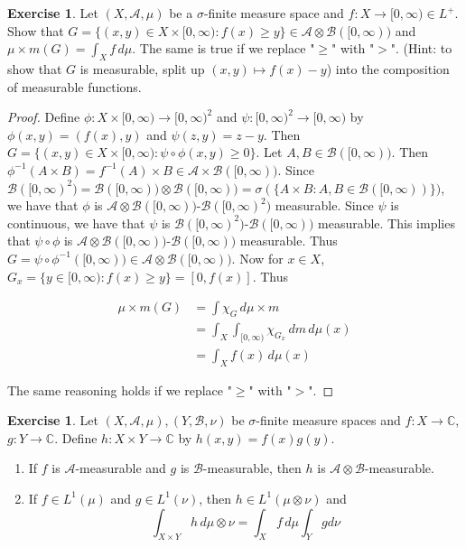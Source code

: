 \documentclass{book}
\theoremstyle{definition}
\newtheorem{ex}[definition]{Exercise}
\newcommand{\sig}{\sigma}
\newcommand{\C}{\mathbb{C}}
\newcommand{\MA}{\mathcal{A}}
\newcommand{\MB}{\mathcal{B}}
\newcommand{\lex}[1]{\label{ex:#1}}
\DeclareMathOperator*{\0}{\mbf{0}}
\DeclareMathOperator*{\1}{\mbf{1}}
\newcommand{\Rg}{[0,\infty)}
\newcommand{\dmu}{\, d \mu}
\newcommand{\dm}{\, d m}
\begin{document}
	\begin{ex} \lex{00000} 
		Let $(X, \MA, \mu)$ be a $\sig$-finite measure space and $f:X \rightarrow \Rg \in L^+$. Show that $G = \{(x,y) \in X \times \Rg: f(x) \geq y\} \in \MA \otimes \MB(\Rg)$ and $\mu \times m (G) = \int_X f \dmu$. The same is true if we replace "$\geq$" with "$>$". (Hint: to show that $G$ is measurable, split up $(x,y) \mapsto f(x) - y$) into the composition of measurable functions. 
	\end{ex}
	
	\begin{proof}
		Define $\phi: X \times \Rg \rightarrow \Rg^2$ and $\psi: \Rg^2 \rightarrow \Rg$ by $\phi(x,y) = (f(x),y)$ and $\psi(z,y) = z-y$. Then $G = \{(x,y) \in X \times \Rg: \psi \circ \phi(x,y) \geq 0\}$. Let $A, B \in \MB(\Rg)$. Then $\phi^{-1}(A \times B) = f^{-1}(A) \times B \in \MA \times \MB(\Rg)$. Since $\MB(\Rg^2) = \MB(\Rg) \otimes \MB(\Rg) = \sig(\{A \times B: A, B \in \MB(\Rg)\})$, we have that $\phi$ is $\MA \otimes \MB(\Rg)$-$\MB(\Rg^2)$ measurable. Since $\psi$ is continuous, we have that $\psi$ is $\MB(\Rg^2)$-$\MB(\Rg)$ measurable. This implies that $\psi \circ \phi$ is $\MA \otimes \MB(\Rg)$-$\MB(\Rg)$ measurable. Thus $G = \psi \circ \phi^{-1}(\Rg) \in \MA \otimes \MB(\Rg)$. Now for $x \in X$, $G_x = \{y \in \Rg: f(x) \geq y\} = [0, f(x)]$. Thus 
		
		\begin{align*}
			\mu \times m(G) 
			&= \int \chi_G \dmu \times m\\
			&= \int_X \int_{\Rg} \chi_{G_x} \dm \dmu(x)\\
			&= \int_X f(x) \dmu(x) 
		\end{align*}
		
		The same reasoning holds if we replace "$\geq$" with "$>$".
	\end{proof}
	
	\begin{ex} \lex{00000} 
		Let $(X, \MA, \mu), (Y, \MB, \nu)$ be $\sig$-finite measure spaces and $f:X \rightarrow \C$, $g:Y \rightarrow \C$. Define $h:X \times Y \rightarrow \C$ by $h(x,y) = f(x)g(y)$.
		
		\begin{enumerate}
			\item If $f$ is $\MA$-measurable and $g$ is $\MB$-measurable, then $h$ is $\MA \otimes \MB$-measurable.
			
			\item If $f \in L^1(\mu)$ and $g \in L^1(\nu)$, then $h \in L^1(\mu \otimes \nu)$ and $$\int_{X \times Y}h\dmu \otimes \nu = \int_X f \dmu \int_Y g d\nu$$
		\end{enumerate}
	\end{ex}
	
\end{document}
